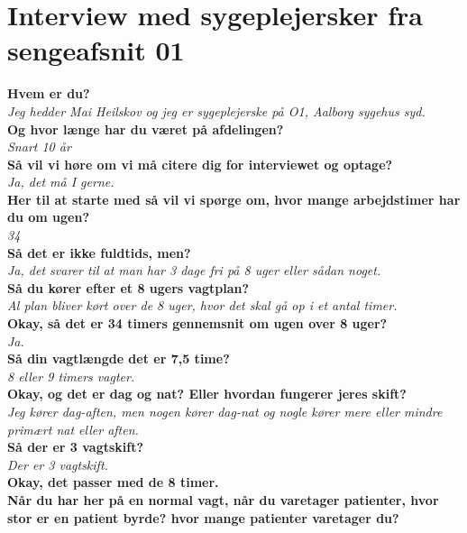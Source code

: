 \section{Interview med sygeplejersker fra sengeafsnit 01} \label{bilag01}
\textbf{Hvem er du?} \\
\noindent
\textit{Jeg hedder Mai Heilskov og jeg er sygeplejerske på O1, Aalborg sygehus syd. } \\
\noindent
\textbf{Og hvor længe har du været på afdelingen?}\\
\noindent
\textit{Snart 10 år} \\
\noindent
\textbf{Så vil vi høre om vi må citere dig for interviewet og optage?}\\
\noindent
\textit{ Ja, det må I gerne.}  \\
\noindent
\textbf{Her til at starte med så vil vi spørge om, hvor mange arbejdstimer har du om ugen?} \\
\noindent
\textit{34} \\
\noindent
\textbf{Så det er ikke fuldtids, men?} \\
\noindent
\textit{Ja, det svarer til at man har 3 dage fri på 8 uger eller sådan noget.} \\
\noindent
\textbf{Så du kører efter et 8 ugers vagtplan?} \\
\noindent
\textit{Al plan bliver kørt over de 8 uger, hvor det skal gå op i et antal timer.} \\
\noindent
\textbf{Okay, så det er 34 timers gennemsnit om ugen over 8 uger?} \\
\noindent
\textit{Ja.} \\
\noindent
\textbf{Så din vagtlængde det er 7,5 time? } \\
\noindent
\textit{8 eller 9 timers vagter.} \\
\noindent
\textbf{Okay, og det er dag og nat? Eller hvordan fungerer jeres skift?} \\
\noindent
\textit{Jeg kører dag-aften, men nogen kører dag-nat og nogle kører mere eller mindre primært nat eller aften.} \\
\noindent
\textbf{Så der er 3 vagtskift?} \\
\noindent
\textit{Der er 3 vagtskift.} \\
\noindent
\textbf{Okay, det passer med de 8 timer.} \\
\noindent
\textbf{Når du har her på en normal vagt, når du varetager patienter, hvor stor er en patient byrde? hvor mange patienter varetager du?} \\
